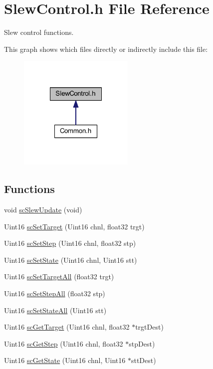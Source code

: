 \hypertarget{a00035}{\section{Slew\-Control.\-h File Reference}
\label{a00035}
}


Slew control functions.  


This graph shows which files directly or indirectly include this file\-:
\nopagebreak
\begin{figure}[H]
\begin{center}
\leavevmode
\includegraphics[width=156pt]{a00057}
\end{center}
\end{figure}
\subsection*{Functions}
\begin{DoxyCompactItemize}
\item 
void \hyperlink{a00035_a8f8f2b1ef59b7fa90122e5609e24cd06}{sc\-Slew\-Update} (void)
\item 
Uint16 \hyperlink{a00035_acd4f1d77c353f333438ae688a9bcc8fe}{sc\-Set\-Target} (Uint16 chnl, float32 trgt)
\item 
Uint16 \hyperlink{a00035_a91e197a77f8f6c05dc478431164114a4}{sc\-Set\-Step} (Uint16 chnl, float32 stp)
\item 
Uint16 \hyperlink{a00035_a92578a062af02eb967ca2dfbd68b00cf}{sc\-Set\-State} (Uint16 chnl, Uint16 stt)
\item 
Uint16 \hyperlink{a00035_a1e7d07e1a6d9b1e40b1b39d97df638b9}{sc\-Set\-Target\-All} (float32 trgt)
\item 
Uint16 \hyperlink{a00035_a2dbe145695a65570ebc1ff5588e08a18}{sc\-Set\-Step\-All} (float32 stp)
\item 
Uint16 \hyperlink{a00035_af4b016a1a10639dfeca7af4f750d8c75}{sc\-Set\-State\-All} (Uint16 stt)
\item 
Uint16 \hyperlink{a00035_ab83b8f320a4bf9e8ea1a251fec458032}{sc\-Get\-Target} (Uint16 chnl, float32 $\ast$trgt\-Dest)
\item 
Uint16 \hyperlink{a00035_adac64f58de9a029d849e0df2962bad16}{sc\-Get\-Step} (Uint16 chnl, float32 $\ast$stp\-Dest)
\item 
Uint16 \hyperlink{a00035_a77a235d70df3aff6a742ff375bd45119}{sc\-Get\-State} (Uint16 chnl, Uint16 $\ast$stt\-Dest)
\end{DoxyCompactItemize}


